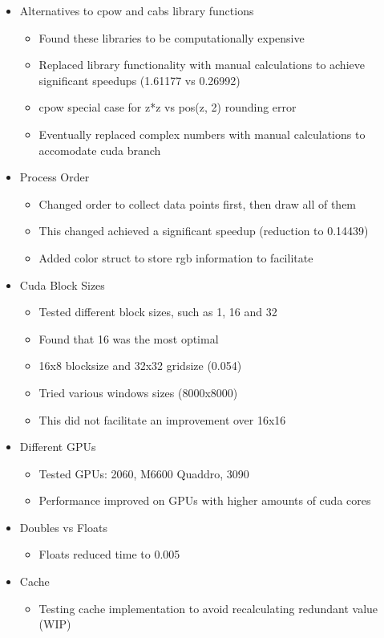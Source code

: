 \documentclass{article}
\begin{document}
\begin{itemize}
\begin{itemize}
    \end{itemize}
    \item Alternatives to cpow and cabs library functions
    \begin{itemize}
        \item Found these libraries to be computationally expensive
        \item Replaced library functionality with manual calculations to achieve significant speedups (1.61177 vs 0.26992)
        \item cpow special case for z*z vs pos(z, 2) rounding error
        \item Eventually replaced complex numbers with manual calculations to accomodate cuda branch
    \end{itemize}
    \item Process Order
    \begin{itemize}
        \item Changed order to collect data points first, then draw all of them
        \item This changed achieved a significant speedup (reduction to 0.14439)
        \item Added color struct to store rgb information to facilitate
    \end{itemize}
    \item Cuda Block Sizes
    \begin{itemize}
        \item Tested different block sizes, such as 1, 16 and 32
        \item Found that 16 was the most optimal
        \item 16x8 blocksize and 32x32 gridsize (0.054)
        \item Tried various windows sizes (8000x8000) 
        \item This did not facilitate an improvement over 16x16
    \end{itemize}
    \item Different GPUs
    \begin{itemize}
        \item Tested GPUs: 2060, M6600 Quaddro, 3090
        \item Performance improved on GPUs with higher amounts of cuda cores
    \end{itemize}
    \item Doubles vs Floats
    \begin{itemize}
        \item Floats reduced time to 0.005
    \end{itemize}
    \item Cache
    \begin{itemize}
        \item Testing cache implementation to avoid recalculating redundant value (WIP)
    \end{itemize}
\end{itemize}
\end{document}
